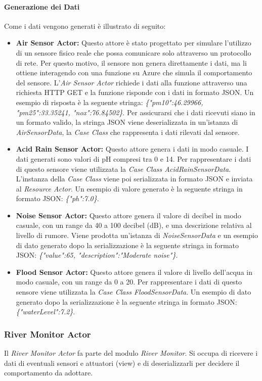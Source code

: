 \documentclass{scrartcl}
\begin{document}
\paragraph{Generazione dei Dati}
Come i dati vengono generati è illustrato di seguito:
\begin{itemize}
    \item \textbf{Air Sensor Actor:} Questo attore è stato progettato per simulare l'utilizzo di un sensore fisico reale che possa comunicare solo attraverso un protocollo di rete. Per questo motivo, il sensore non genera direttamente i dati, ma li ottiene interagendo con una funzione su Azure che simula il comportamento del sensore. L'\textit{Air Sensor Actor} richiede i dati alla funzione attraverso una richiesta HTTP GET e la funzione risponde con i dati in formato JSON. Un esempio di risposta è la seguente stringa: \textit{\{"pm10":46.29966, "pm25":33.35241, "nox":76.84502\}}. Per assicurarsi che i dati ricevuti siano in un formato valido, la stringa JSON viene deserializzata in un'istanza di \textit{AirSensorData}, la \textit{Case Class} che rappresenta i dati rilevati dal sensore.
    \item \textbf{Acid Rain Sensor Actor:} Questo attore genera i dati in modo casuale. I dati generati sono valori di pH compresi tra 0 e 14. Per rappresentare i dati di questo sensore viene utilizzata la \textit{Case Class AcidRainSensorData}. L'instanza della \textit{Case Class} viene poi serializzata in formato JSON e inviata al \textit{Resource Actor}. Un esempio di valore generato è la seguente stringa in formato JSON: \textit{\{"ph":7.0\}}.
    \item \textbf{Noise Sensor Actor:} Questo attore genera il valore di decibel in modo casuale, con un range da 40 a 100 decibel (dB), e una descrizione relativa al livello di rumore. Viene prodotta un'istanza di \textit{NoiseSensorData} e un esempio di dato generato dopo la serializzazione è la seguente stringa in formato JSON: \textit{\{"value":65, "description":"Moderate noise"\}}.
    \item \textbf{Flood Sensor Actor:} Questo attore genera il valore di livello dell'acqua in modo casuale, con un range da 0 a 20. Per rappresentare i dati di questo sensore viene utilizzata la \textit{Case Class FloodSensorData}. Un esempio di dato generato dopo la serializzazione è la seguente stringa in formato JSON: \textit{\{"waterLevel":7.2\}}.
\end{itemize}

\subsubsection{River Monitor Actor}
Il \textit{River Monitor Actor} fa parte del modulo \textit{River Monitor}.
Si occupa di ricevere i dati di eventuali sensori e attuatori (view) e di deserializzarli per decidere il comportamento da adottare.
\end{document}

